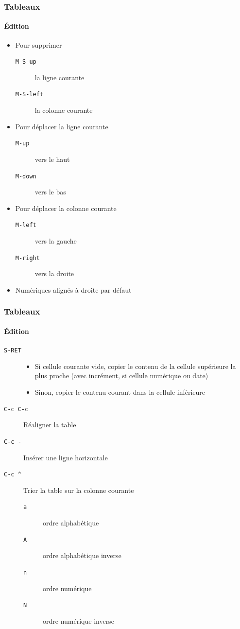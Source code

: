 \documentclass[presentation,t,hideothersubsections]{beamer}
\begin{document}
\begin{frame}
\frametitle{Tableaux}
\framesubtitle{Édition}
\label{sec-3-3-3}


\begin{itemize}
\item Pour supprimer
\begin{description}
\item[\texttt{M-S-up}] la ligne courante
\item[\texttt{M-S-left}] la colonne courante
\end{description}
\item Pour déplacer la ligne courante
\begin{description}
\item[\texttt{M-up}] vers le haut
\item[\texttt{M-down}] vers le bas
\end{description}
\item Pour déplacer la colonne courante
\begin{description}
\item[\texttt{M-left}] vers la gauche
\item[\texttt{M-right}] vers la droite
\end{description}
\item Numériques alignés à droite par défaut
\end{itemize}
\end{frame}
\begin{frame}
\frametitle{Tableaux}
\framesubtitle{Édition}
\label{sec-3-3-4}


\begin{description}
\item[\texttt{S-RET}] 
\begin{itemize}
\item Si cellule courante vide, copier le contenu de la cellule supérieure la
    plus proche (avec incrément, si cellule numérique ou date)
\item Sinon, copier le contenu courant dans la cellule inférieure
\end{itemize}
\item[\texttt{C-c C-c}] Réaligner la table
\item[\texttt{C-c -}] Insérer une ligne horizontale
\item[\texttt{C-c \textasciicircum{}}] Trier la table sur la colonne courante
\begin{description}
\item[\texttt{a}] ordre alphabétique
\item[\texttt{A}] ordre alphabétique inverse
\item[\texttt{n}] ordre numérique
\item[\texttt{N}] ordre numérique inverse
\end{description}
\end{description}
\end{frame}
\end{document}
